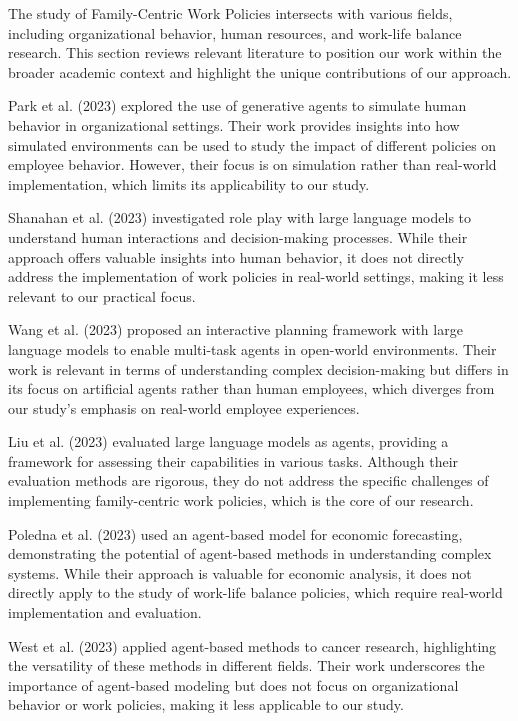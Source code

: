 \documentclass{article} %
\begin{document}
The study of Family-Centric Work Policies intersects with various fields, including organizational behavior, human resources, and work-life balance research. This section reviews relevant literature to position our work within the broader academic context and highlight the unique contributions of our approach.

Park et al. (2023) explored the use of generative agents to simulate human behavior in organizational settings. Their work provides insights into how simulated environments can be used to study the impact of different policies on employee behavior. However, their focus is on simulation rather than real-world implementation, which limits its applicability to our study.

Shanahan et al. (2023) investigated role play with large language models to understand human interactions and decision-making processes. While their approach offers valuable insights into human behavior, it does not directly address the implementation of work policies in real-world settings, making it less relevant to our practical focus.

Wang et al. (2023) proposed an interactive planning framework with large language models to enable multi-task agents in open-world environments. Their work is relevant in terms of understanding complex decision-making but differs in its focus on artificial agents rather than human employees, which diverges from our study's emphasis on real-world employee experiences.

Liu et al. (2023) evaluated large language models as agents, providing a framework for assessing their capabilities in various tasks. Although their evaluation methods are rigorous, they do not address the specific challenges of implementing family-centric work policies, which is the core of our research.

Poledna et al. (2023) used an agent-based model for economic forecasting, demonstrating the potential of agent-based methods in understanding complex systems. While their approach is valuable for economic analysis, it does not directly apply to the study of work-life balance policies, which require real-world implementation and evaluation.

West et al. (2023) applied agent-based methods to cancer research, highlighting the versatility of these methods in different fields. Their work underscores the importance of agent-based modeling but does not focus on organizational behavior or work policies, making it less applicable to our study.
\end{document}
